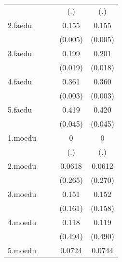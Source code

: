 {\begin{tabular}{l*{4}{c}}
            &                     &                     &         (.)         &         (.)         \\
[1em]
2.faedu     &                     &                     &       0.155\sym{**} &       0.155\sym{**} \\
            &                     &                     &     (0.005)         &     (0.005)         \\
[1em]
3.faedu     &                     &                     &       0.199\sym{*}  &       0.201\sym{*}  \\
            &                     &                     &     (0.019)         &     (0.018)         \\
[1em]
4.faedu     &                     &                     &       0.361\sym{**} &       0.360\sym{**} \\
            &                     &                     &     (0.003)         &     (0.003)         \\
[1em]
5.faedu     &                     &                     &       0.419\sym{*}  &       0.420\sym{*}  \\
            &                     &                     &     (0.045)         &     (0.045)         \\
[1em]
1.moedu     &                     &                     &           0         &           0         \\
            &                     &                     &         (.)         &         (.)         \\
[1em]
2.moedu     &                     &                     &      0.0618         &      0.0612         \\
            &                     &                     &     (0.265)         &     (0.270)         \\
[1em]
3.moedu     &                     &                     &       0.151         &       0.152         \\
            &                     &                     &     (0.161)         &     (0.158)         \\
[1em]
4.moedu     &                     &                     &       0.118         &       0.119         \\
            &                     &                     &     (0.494)         &     (0.490)         \\
[1em]
5.moedu     &                     &                     &      0.0724         &      0.0744         \\

\end{tabular}}
